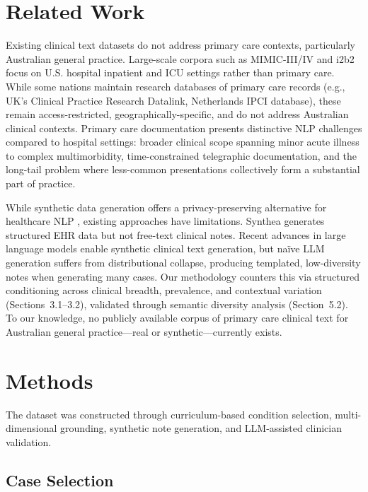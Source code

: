 \documentclass[11pt]{article}
\begin{document}
\section{Related Work}

Existing clinical text datasets do not address primary care contexts, particularly Australian general practice. Large-scale corpora such as MIMIC-III/IV \cite{mimic} and i2b2 \cite{i2b2} focus on U.S. hospital inpatient and ICU settings rather than primary care. While some nations maintain research databases of primary care records (e.g., UK's Clinical Practice Research Datalink, Netherlands IPCI database), these remain access-restricted, geographically-specific, and do not address Australian clinical contexts. Primary care documentation presents distinctive NLP challenges compared to hospital settings: broader clinical scope spanning minor acute illness to complex multimorbidity, time-constrained telegraphic documentation, and the long-tail problem where less-common presentations collectively form a substantial part of practice.

While synthetic data generation offers a privacy-preserving alternative for healthcare NLP \cite{tucker2020, chen2021, synthetic}, existing approaches have limitations. Synthea \cite{synthea} generates structured EHR data but not free-text clinical notes. Recent advances in large language models enable synthetic clinical text generation, but naïve LLM generation suffers from distributional collapse, producing templated, low-diversity notes when generating many cases. Our methodology counters this via structured conditioning across clinical breadth, prevalence, and contextual variation (Sections~3.1--3.2), validated through semantic diversity analysis (Section~5.2). To our knowledge, no publicly available corpus of primary care clinical text for Australian general practice—real or synthetic—currently exists.

\section{Methods}

The dataset was constructed through curriculum-based condition selection, multi-dimensional grounding, synthetic note generation, and LLM-assisted clinician validation.

\subsection{Case Selection}
\end{document}

